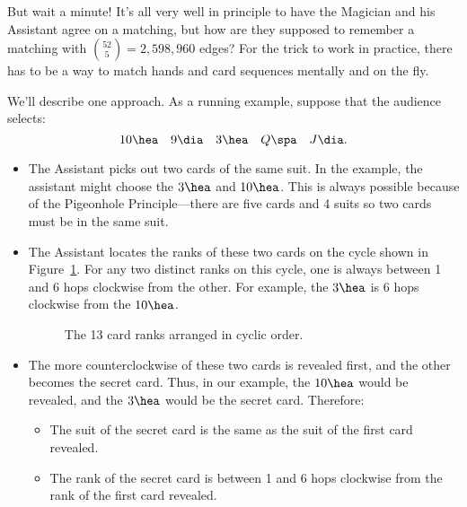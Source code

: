 But wait a minute!  It's all very well in principle to have the Magician
and his Assistant agree on a matching, but how are they supposed to
remember a matching with $\binom{52}{5} = 2,598,960$ edges?  For the trick
to work in practice, there has to be a way to match hands and card
sequences mentally and on the fly.



We'll describe one approach.  As a running example, suppose that the
audience selects:
\[
10 \hea \quad 9 \dia \quad 3 \hea \quad Q \spa \quad J \dia.
\]

\begin{itemize}

\item The Assistant picks out two cards of the same suit.  In the
example, the assistant might choose the $3 \hea$ and $10 \hea$.  This
is always possible because of the Pigeonhole Principle---there are
five cards and 4 suits so two cards must be in the same suit.

\item The Assistant locates the ranks of these two cards on the cycle
  shown in Figure~\ref{fig:11Q11}. For any two distinct ranks on this
  cycle, one is always between 1 and 6 hops clockwise from the other.
  For example, the $3 \hea$ is 6 hops clockwise from the $10 \hea$.


\begin{figure}


\caption{The 13 card ranks arranged in cyclic order.}

\label{fig:11Q11}

\end{figure}

\item The more counterclockwise of these two cards is revealed first,
and the other becomes the secret card.  Thus, in our example, the $10
\hea$ would be revealed, and the $3 \hea$ would be the secret card.
Therefore:

\begin{itemize}

\item The suit of the secret card is the same as the suit of the first
card revealed.

\item The rank of the secret card is between 1 and 6 hops clockwise
from the rank of the first card revealed.


\end{itemize}
\end{itemize}
